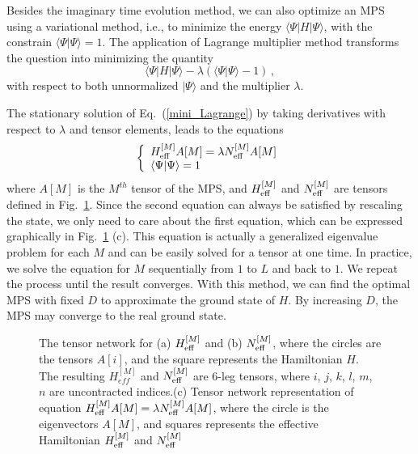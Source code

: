 \documentclass[preprint,3p,times,preprint,showpacs,amsmath,superscriptaddress,floatfix]{elsarticle}
\begin{document}
Besides the imaginary time evolution method, we can also optimize an MPS using a variational method, i.e., to minimize the energy $\langle\Psi|H|\Psi\rangle$, with the constrain $\langle \Psi|\Psi\rangle=1$.
The application of Lagrange multiplier method transforms the question into minimizing the quantity
\begin{equation}\label{mini_Lagrange}
	\langle\Psi|H|\Psi\rangle-\lambda(\langle\Psi|\Psi\rangle-1)\, ,
\end{equation}
with respect to both unnormalized $|\Psi\rangle$ and the multiplier $\lambda$.

The stationary solution of Eq.~(\ref{mini_Lagrange}) by taking derivatives with respect to $\lambda$ and tensor elements, leads to the equations\cite{Schollwoeck2012}
%
\begin{equation}\label{mini_Lagrange2}
\left\{\begin{array}{l}
H_{\rm eff}^{[M]}A[M]=\lambda N_{\rm eff}^{[M]} A[M]\\
\langle\Psi|\Psi\rangle=1
\end{array}
\right.
\end{equation}
%
where $A[M]$ is the $M^{th}$ tensor of the MPS, and $H_{\rm eff}^{[M]}$ and $N_{\rm eff}^{[M]}$ are tensors defined in Fig.~\ref{eigen}. Since the second equation can always be satisfied by rescaling the state, we only need to care about the first equation, which can be expressed graphically in Fig.~\ref{eigen} (c).
This equation is actually a generalized eigenvalue problem for each $M$ and can be easily solved for a tensor at one time. \cite{Schollwoeck2012}
In practice, we solve the equation for $M$ sequentially from $1$ to $L$ and back to $1$. We repeat the process
until the result converges. With this method, we can find the optimal MPS with fixed $D$ to approximate the ground state of $H$. By increasing $D$, the
MPS may converge to the real ground state.


\begin{figure} [!hbp]
		\begin{center}
		\caption{The tensor network for (a) $H_{\rm eff}^{[M]}$ and (b) $N_{\rm eff}^{[M]}$, where the circles are the tensors $A[i]$,
  and the square represents the Hamiltonian $H$.
The resulting $H_{eff}^{[M]}$ and $N_{\rm eff}^{[M]}$ are 6-leg tensors, where $i$, $j$, $k$, $l$, $m$, $n$ are uncontracted indices.(c) Tensor network representation of equation $ H_{\rm eff}^{[M]}A[M]=\lambda N_{\rm eff}^{[M]} A[M] $, where the circle is the eigenvectors $A[M]$, and squares represents the effective Hamiltonian $H_{\rm eff}^{[M]}$ and $N_{\rm eff}^{[M]}$
}\label{eigen}
		\end{center}
\end{figure}
\end{document}

